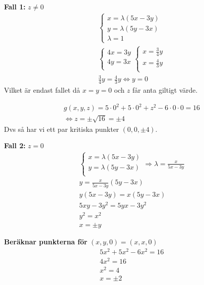 \textbf{Fall 1:} $z\neq0$
\begin{align*}
    &\begin{cases}
        x = \lambda (5x-3y) \\
        y = \lambda (5y-3x) \\
        \lambda = 1
    \end{cases} \\
    &\begin{cases}
        4x = 3y \\
        4y = 3x \\
    \end{cases}
    \begin{cases}
        x = \frac{3}{4}y \\
        x = \frac{4}{3}y  \\
    \end{cases} \\
    & \frac{3}{4}y = \frac{4}{3}y \Leftrightarrow y = 0
\end{align*}
Vilket är endast fallet då $x=y=0$ och $z$ får anta giltigt värde.

\begin{align*}
    &g(x,y,z) = 5\cdot0^2 + 5\cdot0^2 + z^2 -6\cdot 0 \cdot 0 = 16 \\
    &\Leftrightarrow z = \pm \sqrt{16} = \pm 4
\end{align*}
Dvs så har vi ett par kritiska punkter $(0,0,\pm4)$.

\textbf{Fall 2:} $z=0$
\begin{align*}
    &\begin{cases}
        x = \lambda (5x-3y) \\
        y = \lambda (5y-3x) \\
    \end{cases} 
    \Rightarrow \lambda = \frac{x}{5x-3y} \\
    &y = \frac{x}{5x-3y} (5y-3x) \\
    &y(5x-3y) = x(5y-3x)  \\
    &5xy-3y^2 = 5yx-3y^2  \\
    &y^2 = x^2  \\
    &x = \pm y 
\end{align*}

\textbf{Beräknar punkterna för} $(x,y,0) = (x,x,0)$
\begin{align*}
    &5x^2+5x^2 -6x^2 = 16 \\
    &4x^2 = 16 \\
    &x^2 = 4 \\
    &x = \pm2
\end{align*}

